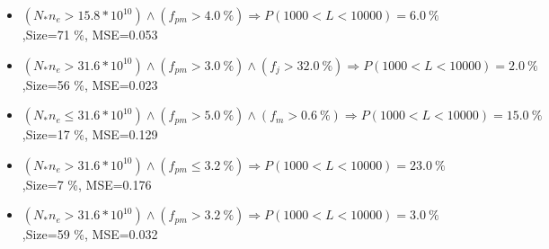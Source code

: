 \documentclass[numbered]{CSL}
\begin{document}
\begin{itemize}
\item $(N_* n_e > 15.8 * 10^{10}) \land (f_{pm} > 4.0~\%) \Rightarrow P(1 000 < L < 10 000) = 6.0~\%$,\hfill Size=71 \%, MSE=0.053
\item $(N_* n_e > 31.6 * 10^{10}) \land (f_{pm} > 3.0~\%) \land (f_j > 32.0~\%) \Rightarrow P(1 000 < L < 10 000) = 2.0~\%$,\hfill Size=56 \%, MSE=0.023
\item $(N_* n_e \leq 31.6 * 10^{10}) \land (f_{pm} > 5.0~\%) \land (f_m > 0.6~\%) \Rightarrow P(1 000 < L < 10 000) = 15.0~\%$,\hfill Size=17 \%, MSE=0.129
\item $(N_* n_e > 31.6 * 10^{10}) \land (f_{pm} \leq 3.2~\%) \Rightarrow P(1 000 < L < 10 000) = 23.0~\%$,\hfill Size=7 \%, MSE=0.176
\item $(N_* n_e > 31.6 * 10^{10}) \land (f_{pm} > 3.2~\%) \Rightarrow P(1 000 < L < 10 000) = 3.0~\%$,\hfill Size=59 \%, MSE=0.032
\end{itemize}
\end{document}
